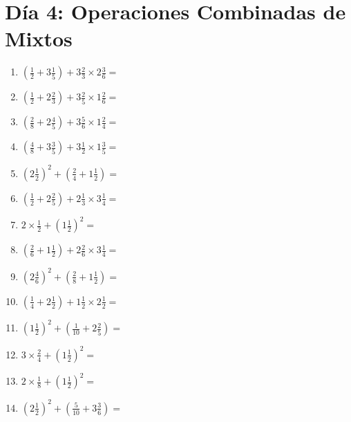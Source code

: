 \documentclass[12pt]{article}
\begin{document}
\section*{Día 4: Operaciones Combinadas de Mixtos}
\begin{enumerate}
\item \large $ (\frac{1}{2} + 3 \frac{1}{5}) + 3 \frac{2}{3} \times 2 \frac{3}{6} = $ \vspace{1.8cm}
\item \large $ (\frac{1}{2} + 2 \frac{2}{3}) + 3 \frac{2}{5} \times 1 \frac{2}{6} = $ \vspace{1.8cm}
\item \large $ (\frac{2}{8} + 2 \frac{4}{5}) + 3 \frac{5}{6} \times 1 \frac{2}{4} = $ \vspace{1.8cm}
\item \large $ (\frac{4}{8} + 3 \frac{3}{5}) + 3 \frac{1}{2} \times 1 \frac{3}{5} = $ \vspace{1.8cm}
\item \large $ (2 \frac{1}{2})^2 + (\frac{2}{4} + 1 \frac{1}{2}) = $ \vspace{1.8cm}
\item \large $ (\frac{1}{2} + 2 \frac{2}{5}) + 2 \frac{1}{3} \times 3 \frac{1}{4} = $ \vspace{1.8cm}
\item \large $ 2 \times \frac{1}{2} + (1 \frac{1}{2})^2 = $ \vspace{1.8cm}
\item \large $ (\frac{2}{6} + 1 \frac{1}{2}) + 2 \frac{2}{6} \times 3 \frac{1}{4} = $ \vspace{1.8cm}
\item \large $ (2 \frac{4}{6})^2 + (\frac{2}{8} + 1 \frac{1}{2}) = $ \vspace{1.8cm}
\item \large $ (\frac{1}{4} + 2 \frac{1}{2}) + 1 \frac{1}{2} \times 2 \frac{1}{2} = $ \vspace{1.8cm}
\newpage
\item \large $ (1 \frac{1}{2})^2 + (\frac{1}{10} + 2 \frac{2}{5}) = $ \vspace{1.8cm}
\item \large $ 3 \times \frac{2}{4} + (1 \frac{1}{2})^2 = $ \vspace{1.8cm}
\item \large $ 2 \times \frac{1}{8} + (1 \frac{1}{2})^2 = $ \vspace{1.8cm}
\item \large $ (2 \frac{1}{2})^2 + (\frac{5}{10} + 3 \frac{3}{6}) = $ \vspace{1.8cm}

\end{enumerate}
\end{document}
